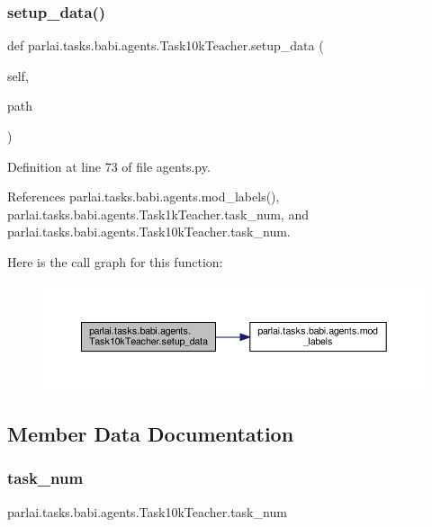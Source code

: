 \subsubsection{\texorpdfstring{setup\+\_\+data()}{setup\_data()}}
{\footnotesize\ttfamily def parlai.\+tasks.\+babi.\+agents.\+Task10k\+Teacher.\+setup\+\_\+data (\begin{DoxyParamCaption}\item[{}]{self,  }\item[{}]{path }\end{DoxyParamCaption})}



Definition at line 73 of file agents.\+py.



References parlai.\+tasks.\+babi.\+agents.\+mod\+\_\+labels(), parlai.\+tasks.\+babi.\+agents.\+Task1k\+Teacher.\+task\+\_\+num, and parlai.\+tasks.\+babi.\+agents.\+Task10k\+Teacher.\+task\+\_\+num.

Here is the call graph for this function\+:
\nopagebreak
\begin{figure}[H]
\begin{center}
\leavevmode
\includegraphics[width=350pt]{classparlai_1_1tasks_1_1babi_1_1agents_1_1Task10kTeacher_a658de67a884d117c04f54e3f9d4bec4a_cgraph}
\end{center}
\end{figure}


\subsection{Member Data Documentation}
\mbox{\label{classparlai_1_1tasks_1_1babi_1_1agents_1_1Task10kTeacher_a71c66ccc1c27b22f0e49863c0926d59c}} 
\subsubsection{\texorpdfstring{task\+\_\+num}{task\_num}}
{\footnotesize\ttfamily parlai.\+tasks.\+babi.\+agents.\+Task10k\+Teacher.\+task\+\_\+num}



